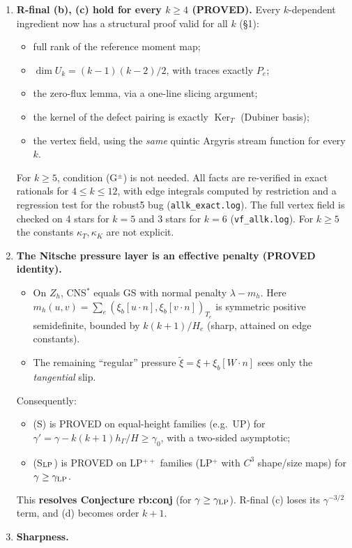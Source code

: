 \documentclass[11pt]{article}
\theoremstyle{remark}
\newcommand{\hG}{h_\Gamma}
\begin{document}
\begin{enumerate}
\item \textbf{R-final (b), (c) hold for every $k\ge4$ (PROVED).} Every $k$-dependent ingredient now has a structural proof valid for all $k$
(\S1):
 \begin{itemize}
 \item full rank of the reference moment map;
 \item $\dim U_k=(k-1)(k-2)/2$, with traces exactly $P_e$;
 \item the zero-flux lemma, via a one-line slicing argument;
 \item the kernel of the defect pairing is exactly $\operatorname{Ker}_T$ (Dubiner basis);
 \item the vertex field, using the \emph{same} quintic Argyris stream function for every $k$.
 \end{itemize}
 For $k\ge5$, condition (G$^\pm$) is not needed. All facts are re-verified in exact rationals for $4\le k\le12$, with edge integrals computed by
 restriction and a regression test for the robust5 bug (\texttt{allk\_exact.log}). The full vertex field is checked on 4 stars for $k=5$ and 3 stars for $k=6$ (\texttt{vf\_allk.log}).
 For $k\ge5$ the constants $\kappa_T,\kappa_K$ are not explicit.
\item \textbf{The Nitsche pressure layer is an effective penalty (PROVED identity).}
 \begin{itemize}
 \item On $Z_h$, CNS$^\ast$ equals GS with normal penalty $\lambda-m_h$. Here $m_h(u,v)=\sum_e(\xi_b[u\cdot n],\xi_b[v\cdot n])_{T_e}$ is symmetric positive semidefinite, bounded by
 $k(k+1)/H_e$ (sharp, attained on edge constants).
 \item The remaining ``regular'' pressure $\tilde\xi=\xi+\xi_b[W\cdot n]$ sees only the \emph{tangential} slip.
 \end{itemize}
 Consequently:
 \begin{itemize}
 \item (S) is PROVED on equal-height families (e.g.\ \textsf{UP}) for $\gamma'=\gamma-k(k+1)\hG/H\ge\gamma_0$, with a two-sided asymptotic;
 \item (S$_{\rm LP}$) is PROVED on LP$^{++}$ families (LP$^+$ with $C^3$ shape/size maps) for $\gamma\ge\gamma_{\rm LP}$.
 \end{itemize}
 This \textbf{resolves Conjecture rb:conj} (for $\gamma\ge\gamma_{\rm LP}$). R-final (c) loses its $\gamma^{-3/2}$ term, and (d) becomes order $k+1$.
\item \textbf{Sharpness.}

\end{enumerate}
\end{document}
